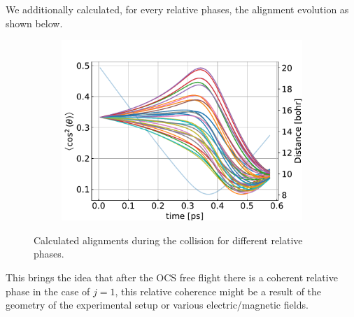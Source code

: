 \documentclass{article}
\begin{document}
    We additionally calculated, for every relative phases, the alignment evolution as shown below.
    \begin{figure}[H]
        \centering
        \begin{subfigure}{.7\linewidth}
            \centering
            \includegraphics[width=\linewidth]{alignments_coriolis_phases.pdf}
        \end{subfigure} 
        \caption{Calculated alignments during the collision for different relative phases.}
    \end{figure}

    This brings the idea that after the OCS free flight there is a coherent relative phase in the case of $j = 1$,
    this relative coherence might be a result of the geometry of the experimental setup or various electric/magnetic fields.
\end{document}
